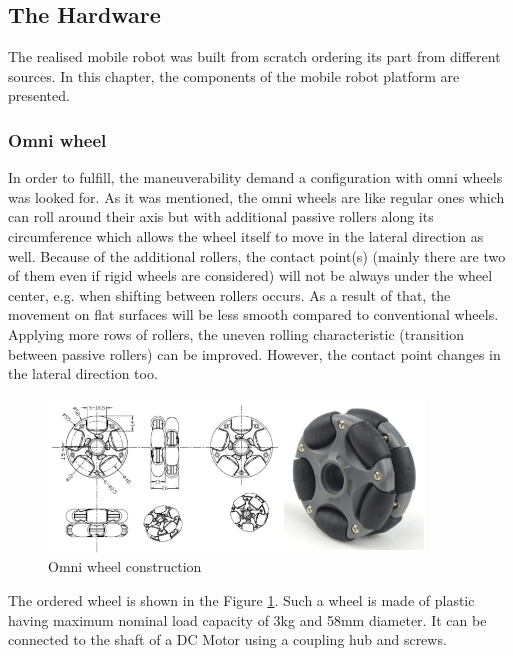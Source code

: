 \documentclass[12pt,english]{article}
\begin{document}
\subsection{The Hardware}
The realised mobile robot was built from scratch ordering its part from different sources. In this chapter, the components of the mobile robot platform are presented.
\subsubsection{Omni wheel}
In order to fulfill, the maneuverability demand a configuration with omni wheels was looked for. As it was mentioned, the omni wheels are like regular ones which can roll around their axis but with additional passive rollers along its circumference which allows the wheel itself to move in the lateral direction as well. Because of the additional rollers, the contact point(s) (mainly there are two of them even if rigid wheels are considered) will not be always under the wheel center, e.g. when shifting between rollers occurs. As a result of that, the movement on flat surfaces will be less smooth compared to conventional wheels. Applying more rows of rollers, the uneven rolling characteristic (transition between passive rollers) can be improved. However, the contact point changes in the lateral direction too. \cite{owp1}
\begin{figure}[htb!]
	\centering
	\includegraphics[width=10cm]{figures/omni_wheel.png}
	\caption{Omni wheel construction}
	\label{omni_wheel}
\end{figure}
The ordered wheel is shown in the Figure \ref{omni_wheel}. Such a wheel is made of plastic having maximum nominal load capacity of 3kg and 58mm diameter. It can be connected to the shaft of a DC Motor using a coupling hub and screws.
\end{document}
